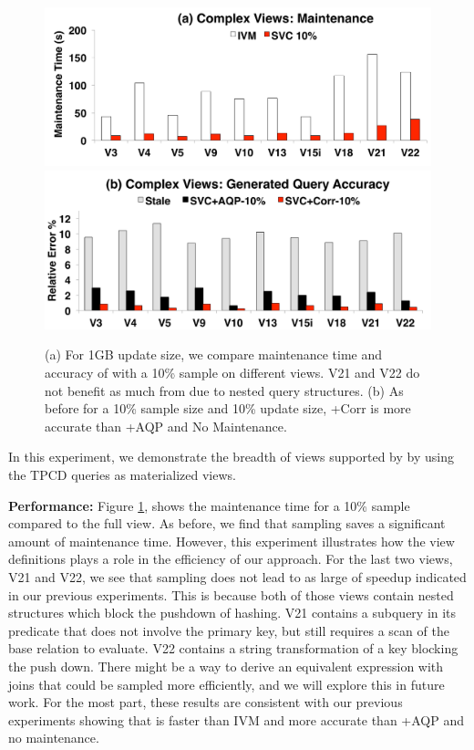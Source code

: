 \begin{figure}[t]\vspace{-2em}
\centering
 \includegraphics[scale=0.13]{exp/msqv_1.pdf}\vspace{.5em}
 \includegraphics[scale=0.13]{exp/msqv_2.pdf} %
 \caption{(a) For 1GB update size, we compare maintenance time and accuracy of \svc with a 10\% sample on different views. V21 and V22 do not benefit as much from \svc due to nested query structures. (b) As before for a 10\% sample size and 10\% update size, \svcnospace+Corr is more accurate than \svcnospace+AQP and No Maintenance.  \label{exp3-acc}}
\end{figure}
In this experiment, we demonstrate the breadth of views supported by \svc by using the TPCD queries as materialized views.

\textbf{Performance: }
Figure \ref{exp3-acc}, shows the maintenance time for a 10\% sample compared to the full view.
As before, we find that sampling saves a significant amount of maintenance time.
However, this experiment illustrates how the view definitions plays a role in the efficiency of our approach.
For the last two views, V21 and V22, we see that sampling does not lead to as large of speedup indicated in our previous experiments.  
This is because both of those views contain nested structures which block the pushdown of hashing.
V21 contains a subquery in its predicate that does not involve the primary key, but still requires a scan of the base relation to evaluate.
V22 contains a string transformation of a key blocking the push down.
There might be a way to derive an equivalent expression with joins that could be sampled more efficiently, and we will explore this in future work.
For the most part, these results are consistent with our previous experiments showing that \svc is faster than IVM and more accurate than \svcnospace+AQP and no maintenance.



